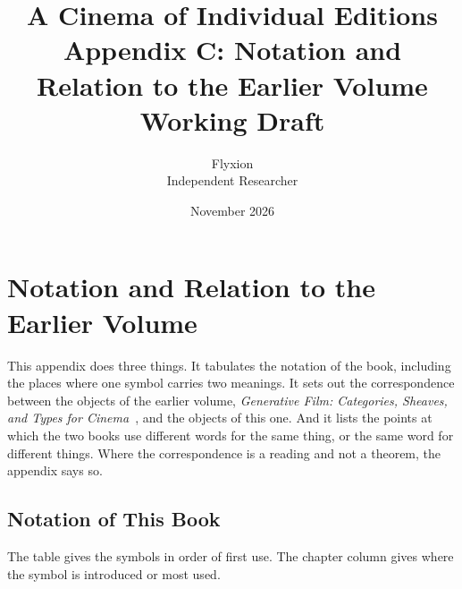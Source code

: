 \documentclass[11pt,twoside,openright]{book}
\title{\Huge\bfseries A Cinema of Individual Editions\\[1.2ex]
\large Appendix C: Notation and Relation to the Earlier Volume\\[0.4ex]
\large Working Draft}
\author{Flyxion\\[0.3ex]\small Independent Researcher}
\date{November 2026}
\theoremstyle{plain}
\theoremstyle{definition}
\theoremstyle{remark}
\begin{document}
\frontmatter
\maketitle
\tableofcontents
\mainmatter
\appendix
\setcounter{chapter}{2}

\chapter{Notation and Relation to the Earlier Volume}
\label{app:notation}

This appendix does three things. It tabulates the notation of the book, including the places where one symbol carries two meanings. It sets out the correspondence between the objects of the earlier volume, \emph{Generative Film: Categories, Sheaves, and Types for Cinema}~\cite{flyxion2026gf}, and the objects of this one. And it lists the points at which the two books use different words for the same thing, or the same word for different things. Where the correspondence is a reading and not a theorem, the appendix says so.

\section{Notation of This Book}\label{sec:notation}

The table gives the symbols in order of first use. The chapter column gives where the symbol is introduced or most used.
\end{document}
